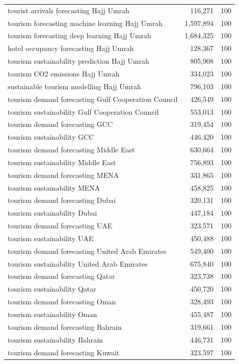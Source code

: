 \begin{longtable}{@{}p{9.2cm}rr@{}}
tourist arrivals forecasting Hajj Umrah & 116,271 & 100 \\
tourism forecasting machine learning Hajj Umrah & 1,597,894 & 100 \\
tourism forecasting deep learning Hajj Umrah & 1,684,325 & 100 \\
hotel occupancy forecasting Hajj Umrah & 128,367 & 100 \\
tourism sustainability prediction Hajj Umrah & 805,908 & 100 \\
tourism CO2 emissions Hajj Umrah & 334,023 & 100 \\
sustainable tourism modelling Hajj Umrah & 796,103 & 100 \\
tourism demand forecasting Gulf Cooperation Council & 426,549 & 100 \\
tourism sustainability Gulf Cooperation Council & 553,013 & 100 \\
tourism demand forecasting GCC & 319,454 & 100 \\
tourism sustainability GCC & 446,420 & 100 \\
tourism demand forecasting Middle East & 630,664 & 100 \\
tourism sustainability Middle East & 756,893 & 100 \\
tourism demand forecasting MENA & 331,865 & 100 \\
tourism sustainability MENA & 458,825 & 100 \\
tourism demand forecasting Dubai & 320,131 & 100 \\
tourism sustainability Dubai & 447,184 & 100 \\
tourism demand forecasting UAE & 323,571 & 100 \\
tourism sustainability UAE & 450,488 & 100 \\
tourism demand forecasting United Arab Emirates & 549,400 & 100 \\
tourism sustainability United Arab Emirates & 675,840 & 100 \\
tourism demand forecasting Qatar & 323,738 & 100 \\
tourism sustainability Qatar & 450,720 & 100 \\
tourism demand forecasting Oman & 328,493 & 100 \\
tourism sustainability Oman & 455,487 & 100 \\
tourism demand forecasting Bahrain & 319,661 & 100 \\
tourism sustainability Bahrain & 446,731 & 100 \\
tourism demand forecasting Kuwait & 323,597 & 100 \\

\end{longtable}
